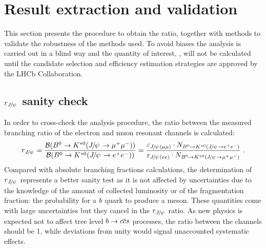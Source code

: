 \section{Result extraction and validation}
\label{sec:RKst_result}

This section presents the procedure to obtain the \RKst ratio, together with
methods to validate the robustness of the methods used.
To avoid biases the analysis is carried out in a blind way and 
the quantity of interest, \RKst, will not be calculated until the candidate 
selection and efficiency estimation strategies are approved by the LHCb Collaboration.



\subsection{$r_{\jpsi}$ sanity check}
\label{sec:Rjpsi}

In order to cross-check the analysis procedure, the ratio between the
measured branching ratio of the electron and muon resonant channels is calculated:
%
\begin{equation}
r_{\jpsi} = \frac{\BR(\Bz\to\Kstarz(\jpsi\to \mumu))} {\BR(\Bz\to\Kstarz(\jpsi\to \epem))} 
= \frac{\varepsilon_{\jpsi(\mu\mu)} \cdot N_{\Bz\to\Kstarz(\jpsi\to \epem)}}{\varepsilon_{\jpsi(ee)} 
\cdot N_{\Bz\to\Kstarz(\jpsi\to \mumu)}}\;.
\end{equation}
%
Compared with absolute branching fractions calculations, the determination of $r_{\jpsi}$ represents a better
sanity test as it is not affected by uncertainties due to the knowledge of the amount of collected 
luminosity or of the fragmentation fraction: the probability for a ${b}$
quark to produce a \Bz meson. These quantities come with large uncertainties but they cancel
in the $r_{\jpsi}$ ratio. As new physics is expected not to affect tree level $b\rightarrow{\ensuremath{c}}{\ensuremath{\overline {{c}}}}{\ensuremath{s}}$ 
processes, the ratio between the \jpsi channels should be 1, while deviations from unity would signal
unaccounted systematic effects.

%
%


